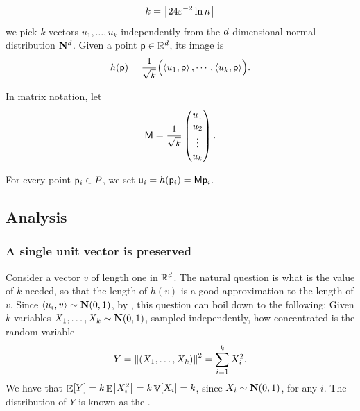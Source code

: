 \begin{equation}
    k = \ceil{24\eps^{-2} \ln n}
    \eqlab{k:val:j:l}%
\end{equation}
we pick $k$ vectors $u_1, \ldots, u_k$ independently from the
$d$-dimensional normal distribution $\mathbf{N}^{d}$. Given a
point $\mathsf{p} \in \mathbb{R}^d$, its image is
\begin{equation*}
    h(\pnt)%
    =%
    \frac{1}{\sqrt{k}} \Bigl( \DotProd{u_1}{\pnt}, \cdots,
    \DotProd{u_k}{\pnt} \Bigr).     
\end{equation*}

In matrix notation, let
\begin{equation*}
    \mathsf{M} = \frac{1}{\sqrt{k}} 
    \begin{pmatrix} u_1\\ u_2\\ \vdots\\ u_k
        \end{pmatrix}.    
\end{equation*}

For every point $\mathsf{p}_i \in P$, we set
$\mathsf{u}_i = h(\mathsf{p}_i) = \mathsf{M} \mathsf{p}_i$.


\subsection{Analysis}

\subsubsection{A single unit vector is preserved}




Consider a vector $v$ of length one in $\mathbb{R}^d$. The natural
question is what is the value of $k$ needed, so that the length of
$h(v)$ is a good approximation to the length of $v$.  Since
$\DotProd{u_i}{v} \sim \NormalY{0}{1}$, by
, this question can boil down to the
following: Given $k$ variables $X_1, \ldots, X_k \sim \NormalY{0}{1}$,
sampled independently, how concentrated is the random variable
\begin{equation*}
    Y%
    =%
    \norm{(X_1, \ldots, X_k)}^2%
    =%
    \sum_{i=1}^k X_i^2.
\end{equation*}
We have that $\mathop{\mathbb{E}}\!\left[ {Y} \right] = k \mathop{\mathbb{E}}\!\left[ {X_i^2} \right] = k \mathop{\mathbb{V}}\!\left[ {X_i} \right] = k$, since
$X_i \sim \NormalY{0}{1}$, for any $i$. The distribution of $Y$ is
known as the .

